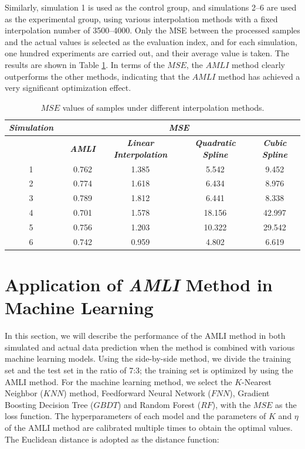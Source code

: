 \documentclass[mathematics,article,accept,pdftex,moreauthors]{Definitions/mdpi}
\begin{document}
Similarly, simulation 1 is used as the control group, and simulations 2--6 are used as the experimental group, using various interpolation methods with a fixed interpolation number of 3500--4000. Only the MSE between the processed samples and the actual values is selected as the evaluation index, and for each simulation, one hundred experiments are carried out, and their average value is taken. The results are shown in Table \ref{tab2}. In terms of the $MSE$, the $AMLI$ method clearly outperforms the other methods, indicating that the $AMLI$ method has achieved a very significant optimization effect.

\begin{table}[H]
	\renewcommand{\tablename}{Table}
	\caption{$MSE$ values of samples under different interpolation methods.}
	\label{tab2}
	{\renewcommand{\tabcolsep}{3.7mm}
		\small\begin{tabular}{cccccc}
			\toprule
		{\emph{\textbf{Simulation}} } 
  & \multicolumn{5}{c}{{\emph{\textbf{MSE}}}}    \\
			\midrule
			 & & {\emph{\textbf{AMLI}}} & {\emph{\textbf{Linear Interpolation}}} & {\emph{\textbf{Quadratic Spline}}}  & {\emph{\textbf{Cubic Spline}}}   \\\midrule
			1 & & 0.762 & 1.385 & 5.542 & 9.452  \\
			2 & & 0.774 & 1.618 & 6.434 & 8.976  \\
			3 & & 0.789 & 1.812 & 6.441 & 8.338  \\
			4 & & 0.701 & 1.578 & 18.156 & 42.997 \\
			5 & & 0.756 & 1.203 & 10.322 & 29.542 \\
			6 & & 0.742 & 0.959 & 4.802 & 6.619 \\
			\bottomrule
	\end{tabular}}
\end{table}
\section{ Application of  \emph{AMLI} Method in Machine Learning}
 In this section, we will describe the performance of the AMLI method in both simulated and actual data prediction when the method is combined with various machine learning models. Using the side-by-side method, we divide the training set and the test set in the ratio of 7:3; the training set is optimized by using the AMLI method. For the machine learning method, we select the $K$-Nearest Neighbor ($KNN$) method, Feedforward Neural Network ($FNN$), Gradient Boosting Decision Tree ($GBDT$) and Random Forest ($RF$), with the $MSE$ as the loss function. The hyperparameters of each model and the parameters of $K$ and $\eta$ of the AMLI method are calibrated multiple times to obtain the optimal values. The Euclidean distance is adopted as the distance function:
\end{document}
